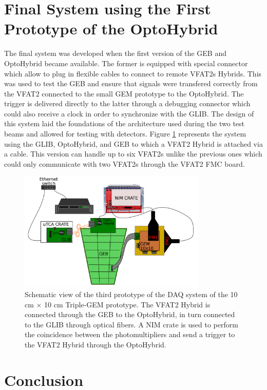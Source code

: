   \section{Final System using the First Prototype of the OptoHybrid}

    The final system was developed when the first version of the GEB and OptoHybrid became available. The former is equipped with special connector which allow to plug in flexible cables to connect to remote VFAT2s Hybrids. This was used to test the GEB and ensure that signals were transfered correctly from the VFAT2 connected to the small GEM prototype to the OptoHybrid. The trigger is delivered directly to the latter through a debugging connector which could also receive a clock in order to synchronize with the GLIB. The design of this system laid the foundations of the architecture used during the two test beams and allowed for testing with detectors. Figure \ref{fig:III-1-sys-3} represents the system using the GLIB, OptoHybrid, and GEB to which a VFAT2 Hybrid is attached via a cable. This version can handle up to six VFAT2s unlike the previous ones which could only communicate with two VFAT2s through the VFAT2 FMC board.

    \begin{figure}[h!]
      \centering
      \includegraphics[width=0.8\textwidth]{img/III-1-arch/sys_3.png}
      \caption{Schematic view of the third prototype of the DAQ system of the 10 cm $ \times $ 10 cm Triple-GEM prototype. The VFAT2 Hybrid is connected through the GEB to the OptoHybrid, in turn connected to the GLIB through optical fibers. A NIM crate is used to perform the coincidence between the photomultipliers and send a trigger to the VFAT2 Hybrid through the OptoHybrid.}
      \label{fig:III-1-sys-3}
    \end{figure}

  \section{Conclusion}

